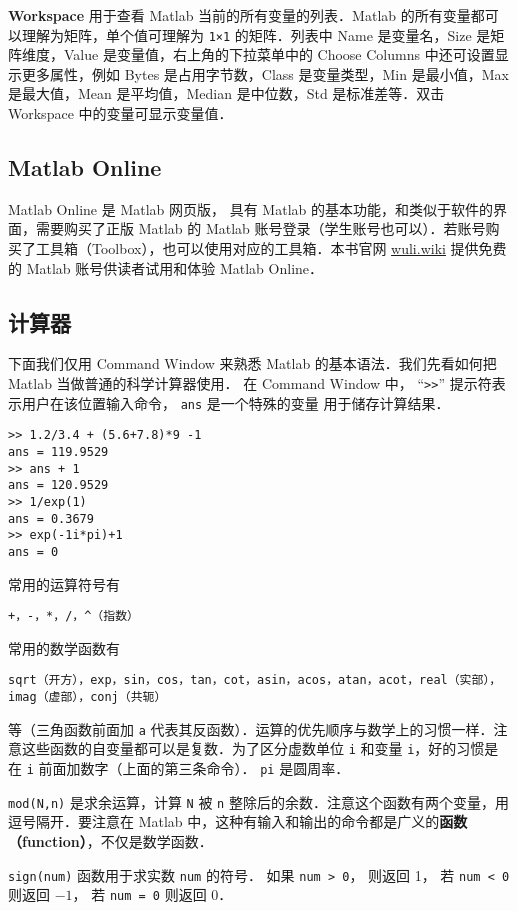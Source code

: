 \textbf{Workspace} 用于查看 Matlab 当前的所有变量的列表．Matlab 的所有变量都可以理解为矩阵，单个值可理解为 \verb|1×1| 的矩阵．列表中 Name 是变量名，Size 是矩阵维度，Value 是变量值，右上角的下拉菜单中的 Choose Columns 中还可设置显示更多属性，例如 Bytes 是占用字节数，Class 是变量类型，Min 是最小值，Max 是最大值，Mean 是平均值，Median 是中位数，Std 是标准差等．双击 Workspace 中的变量可显示变量值．

\subsection{Matlab Online}
Matlab Online 是 Matlab 网页版， 具有 Matlab 的基本功能，和类似于软件的界面，需要购买了正版 Matlab 的 Matlab 账号登录（学生账号也可以）．若账号购买了工具箱（Toolbox），也可以使用对应的工具箱．本书官网 \href{http://wuli.wiki}{wuli.wiki} 提供免费的 Matlab 账号供读者试用和体验 Matlab Online．

\subsection{计算器}
下面我们仅用 Command Window 来熟悉 Matlab 的基本语法．我们先看如何把 Matlab 当做普通的科学计算器使用． 在 Command Window 中， “\verb|>>|” 提示符表示用户在该位置输入命令， \verb|ans| 是一个特殊的变量 用于储存计算结果．
\begin{lstlisting}[language=matlabC]
>> 1.2/3.4 + (5.6+7.8)*9 -1
ans = 119.9529
>> ans + 1
ans = 120.9529
>> 1/exp(1)
ans = 0.3679
>> exp(-1i*pi)+1
ans = 0
\end{lstlisting}
常用的运算符号有
\begin{lstlisting}[language=matlabC]
+，-，*，/，^（指数）
\end{lstlisting}
常用的数学函数有
\begin{lstlisting}[language=matlabC]
sqrt（开方），exp，sin，cos，tan，cot，asin，acos，atan，acot，real（实部），imag（虚部），conj（共轭）
\end{lstlisting}
等（三角函数前面加 \verb|a| 代表其反函数）．运算的优先顺序与数学上的习惯一样．注意这些函数的自变量都可以是复数．为了区分虚数单位 \verb|i| 和变量 \verb|i|，好的习惯是在 \verb|i| 前面加数字（上面的第三条命令）． \verb|pi| 是圆周率．

\verb|mod(N,n)| 是求余运算，计算 \verb|N| 被 \verb|n| 整除后的余数．注意这个函数有两个变量，用逗号隔开．要注意在 Matlab 中，这种有输入和输出的命令都是广义的\textbf{函数（function）}，不仅是数学函数．

\verb|sign(num)| 函数用于求实数 \verb|num| 的符号． 如果 \verb|num > 0|， 则返回 1， 若 \verb|num < 0| 则返回 $-1$， 若 \verb|num = 0| 则返回 0．

